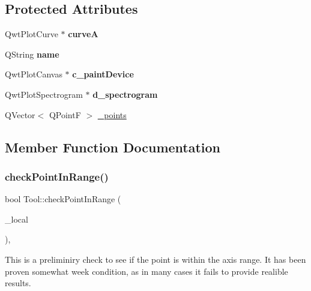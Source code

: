 \subsection*{Protected Attributes}
\begin{DoxyCompactItemize}
\item 
\mbox{\label{classLineTool_a725a5d5089cb76171ed019a8e1274268}} 
Qwt\+Plot\+Curve $\ast$ {\bfseries curveA}
\item 
\mbox{\label{classTool_af0935d8e8edd73d8ec85424b5b15196b}} 
Q\+String {\bfseries name}
\item 
\mbox{\label{classTool_a1e301a03c5806c900786760d80049380}} 
Qwt\+Plot\+Canvas $\ast$ {\bfseries c\+\_\+paint\+Device}
\item 
\mbox{\label{classTool_af1d11cc5374ba7eb7c1d41cfb5d4e981}} 
Qwt\+Plot\+Spectrogram $\ast$ {\bfseries d\+\_\+spectrogram}
\item 
Q\+Vector$<$ Q\+PointF $>$ \mbox{\hyperlink{classTool_a68be77a2e364a7b13d7206388ba5843e}{\+\_\+points}}
\end{DoxyCompactItemize}


\subsection{Member Function Documentation}
\mbox{\label{classTool_a81244366dc1b9f55465ed6f37b81033c}} 
\subsubsection{\texorpdfstring{check\+Point\+In\+Range()}{checkPointInRange()}}
{\footnotesize\ttfamily bool Tool\+::check\+Point\+In\+Range (\begin{DoxyParamCaption}\item[{const Q\+PointF \&}]{\+\_\+local }\end{DoxyParamCaption})\hspace{0.3cm}{\ttfamily [protected]}, {\ttfamily [inherited]}}

This is a preliminiry check to see if the point is within the axis range. It has been proven somewhat week condition, as in many cases it fails to provide realible results. \mbox{\label{classLineTool_a2bcf5d5694e36445607c68c37e4f3f69}} 
